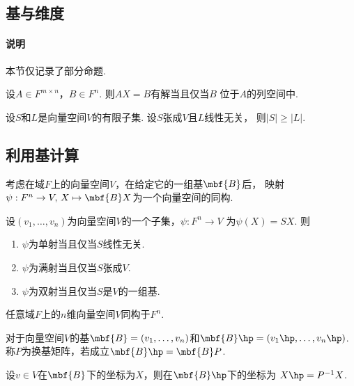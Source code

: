 \subsection{基与维度}
  \paragraph{说明}
    本节仅记录了部分命题.

  \begin{thm}
    设$A\in F^{m\times n}$，$B\in F^n$. 则$AX=B$有解当且仅当$B$
    位于$A$的列空间中.
  \end{thm}

  \begin{thm}
    设$S$和$L$是向量空间$V$的有限子集. 设$S$张成$V$且$L$线性无关，
    则$|S|\ge |L|$.
  \end{thm}

\subsection{利用基计算}

  \begin{pos}
    考虑在域$F$上的向量空间$V$，在给定它的一组基$\mbf{B}$后，
    映射$\psi: F^n\to V,\, X\mapsto\mbf{B}X$为一个向量空间的同构.
  \end{pos}

  \begin{pos}
    设$(v_1,\dots,v_n)$为向量空间$V$的一个子集，$\psi: F^n\to V$
    为$\psi(X)=SX$. 则
    \begin{enumerate}
      \item $\psi$为单射当且仅当$S$线性无关.
      \item $\psi$为满射当且仅当$S$张成$V$.
      \item $\psi$为双射当且仅当$S$是$V$的一组基.
    \end{enumerate}
  \end{pos}

  \begin{cor}
    任意域$F$上的$n$维向量空间$V$同构于$F^n$.
  \end{cor}

  \begin{defi}[换基矩阵]
    对于向量空间$V$的基$\mbf{B}=(v_1,\dots,v_n)$和$\mbf{B}\hp=(v_1\hp,
    \dots,v_n\hp)$. 称$P$为换基矩阵，若成立$\mbf{B}\hp=\mbf{B}P$.
  \end{defi}
  \remark
    设$v\in V$在$\mbf{B}$下的坐标为$X$，则在$\mbf{B}\hp$下的坐标为
    $X\hp = P^{-1}X$.

